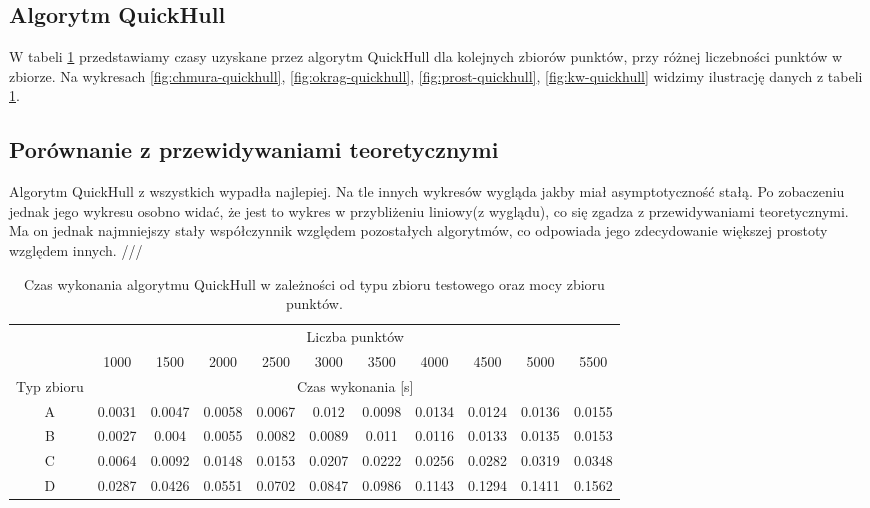 \documentclass[11pt]{article}
\theoremstyle{remark} \newtheorem{definition}{def.}
\theoremstyle{definition} \newtheorem{twierdzenie}{tw.}
\begin{document}
\subsection{Algorytm QuickHull}

W tabeli \ref{tab:quickhull} przedstawiamy czasy uzyskane przez algorytm QuickHull dla kolejnych zbiorów punktów, przy różnej liczebności punktów w zbiorze. Na wykresach \ref{fig:chmura-quickhull}, 
\ref{fig:okrag-quickhull}, \ref{fig:prost-quickhull}, \ref{fig:kw-quickhull} widzimy ilustrację danych z tabeli \ref{tab:quickhull}.

\subsection{Porównanie z przewidywaniami teoretycznymi}
Algorytm QuickHull z wszystkich wypadła najlepiej. Na tle innych wykresów wygląda jakby miał asymptotyczność stałą. 
Po zobaczeniu jednak jego wykresu osobno widać, że jest to wykres w przybliżeniu liniowy(z wyglądu), co się zgadza z przewidywaniami teoretycznymi.
Ma on jednak najmniejszy stały współczynnik względem pozostałych algorytmów, co odpowiada jego zdecydowanie większej prostoty względem innych.
///

\begin{table}[]
\centering
\caption{Czas wykonania algorytmu QuickHull w zależności od typu zbioru testowego oraz mocy zbioru punktów.}
\label{tab:quickhull}
\begin{tabular}{c|c|c|c|c|c|c|c|c|c|c|}
\cline{2-11}
\multicolumn{1}{l|}{} & \multicolumn{10}{c|}{Liczba punktów} \\ \cline{2-11} 
\multicolumn{1}{l|}{} & 1000 & 1500 & 2000 & 2500 & 3000 & 3500 & 4000 & 4500 & 5000 & 5500 \\ \hline
\multicolumn{1}{|c|}{Typ zbioru} & \multicolumn{10}{c|}{Czas wykonania {[}s{]}} \\ \hline
\multicolumn{1}{|c|}{A} & 0.0031 & 0.0047 & 0.0058 & 0.0067 & 0.012 & 0.0098 & 0.0134 & 0.0124 & 0.0136 & 0.0155 \\ \hline
\multicolumn{1}{|c|}{B} & 0.0027 & 0.004 & 0.0055 & 0.0082 & 0.0089 & 0.011 & 0.0116 & 0.0133 & 0.0135 & 0.0153 \\ \hline
\multicolumn{1}{|c|}{C} & 0.0064 & 0.0092 & 0.0148 & 0.0153 & 0.0207 & 0.0222 & 0.0256 & 0.0282 & 0.0319 & 0.0348 \\ \hline
\multicolumn{1}{|c|}{D} & 0.0287 & 0.0426 & 0.0551 & 0.0702 & 0.0847 & 0.0986 & 0.1143 & 0.1294 & 0.1411 & 0.1562 \\ \hline
\end{tabular}
\end{table}
\end{document}
